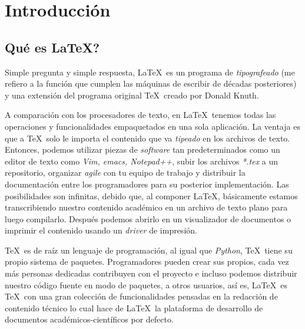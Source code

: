 \documentclass[11pt]{article}
\begin{document}
    \section[Intro.]{Introducción}\label{sec:introducción}
    \subsection{Qué es \LaTeX?}\label{subsec:¿qué-es-latex?}
    Simple pregunta y simple respuesta, \LaTeX\ es un programa de \emph{tipografeado} (me refiero a la función que cumplen las máquinas de escribir de décadas posteriores) y una extensión del programa original \TeX\ creado por Donald Knuth.

    A comparación con los procesadores de texto, en \LaTeX\ tenemos todas las operaciones y funcionalidades empaquetados en una sola aplicación.
    La ventaja es que a \TeX\ solo le importa el contenido que va \emph{tipeado} en los archivos de texto.
    Entonces, podemos utilizar piezas de \emph{software} tan predeterminados como un editor de texto como \emph{Vim, emacs, Notepad++}, subir los archivos \emph{*.tex} a un repositorio, organizar \emph{agile} con tu equipo de trabajo y distribuir la documentación entre los programadores para su posterior implementación.
    Las posibilidades son infinitas, debido que, al componer \LaTeX, básicamente estamos transcribiendo nuestro contenido académico en un archivo de texto plano para luego compilarlo.
    Después podemos abrirlo en un visualizador de documentos o imprimir el contenido usando un \emph{driver} de impresión.
    
    \TeX\ es de raíz un lenguaje de programación, al igual que \emph{Python}, \TeX\ tiene su propio sistema de paquetes. Programadores pueden crear sus propios, cada vez más personas dedicadas contribuyen con el proyecto e incluso podemos distribuir nuestro código fuente en modo de paquetes, a otros usuarios, así es, \LaTeX\ es \TeX\ con una gran colección de funcionalidades pensadas en la redacción de contenido técnico lo cual hace de \LaTeX\ la plataforma de desarrollo de documentos académicos-científicos por defecto.   
\end{document}
